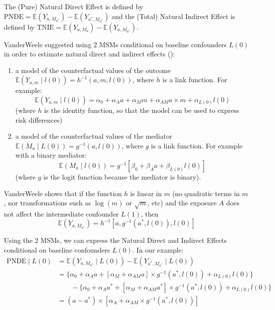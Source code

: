 \documentclass[
]{book}
\begin{document}
The (Pure) Natural Direct Effect is defined by \(\text{PNDE} = \mathbb{E}(Y_{a,M_{a^*}}) - \mathbb{E}(Y_{a^*,M_{a^*}})\) and the (Total) Natural Indirect Effect is defined by \(\text{TNIE} = \mathbb{E}(Y_{a,M_a}) - \mathbb{E}(Y_{a,M_{a^*}})\).

VanderWeele suggested using 2 MSMs conditional on baseline confounders \(L(0)\) in order to estimate natural direct and indirect effects ():

\begin{enumerate}
\def\labelenumi{\arabic{enumi})}
\item
  a model of the counterfactual values of the outcome \(\mathbb{E}(Y_{a,m} \mid l(0))=h^{-1}(a,m,l(0))\), where \(h\) is a link function. For example:
  \begin{equation}
      \mathbb{E}(Y_{a,m} \mid l(0)) = \alpha_0 + \alpha_A a + \alpha_M m + \alpha_{AM} a \times m + \alpha_{L(0)} l(0) \label{eq:MSM-Indirect-model1}
    \end{equation}
  (where \(h\) is the identity function, so that the model can be used to express risk differences)
\item
  a model of the counterfactual values of the mediator \(\mathbb{E}(M_{a} \mid L(0))=g^{-1}(a,l(0))\), where \(g\) is a link function. For example with a binary mediator:
  \begin{equation}
      \mathbb{E}(M_a \mid l(0)) = g^{-1}\left[\beta_0 + \beta_A a + \beta_{L(0)} l(0) \right]
      \label{eq:MSM-Indirect-model2}
    \end{equation}
  (where \(g\) is the logit function because the mediator is binary).
\end{enumerate}

VanderWeele shows that if the function \(h\) is linear in \(m\) (no quadratic terms in \(m\), nor transformations such as \(\log(m)\) or \(\sqrt{m}\), etc) and the exposure \(A\) does not affect the intermediate confounder \(L(1)\), then
\begin{equation*}
  \mathbb{E}(Y_{a,M_{a^*}}) = h^{-1}\left[a,g^{-1}\left(a^*,l(0)\right),l(0)\right]
\end{equation*}

Using the 2 MSMs, we can express the Natural Direct and Indirect Effects conditional on baseline confounders \(L(0)\). In our example:
\begin{align*}
  \text{PNDE} \mid L(0) &= \mathbb{E}(Y_{a,M_{a^*}} \mid L(0)) - \mathbb{E}(Y_{a^*,M_{a^*}} \mid L(0)) \\
  &= \{\alpha_0 + \alpha_A a + [\alpha_M + \alpha_{AM}a] \times g^{-1}(a^*,l(0)) + \alpha_{L(0)} l(0) \} \\
  & \quad \quad - \{ \alpha_0 + \alpha_A a^*+ [\alpha_M + \alpha_{AM}a^*] \times g^{-1}(a^*,l(0)) + \alpha_{L(0)} l(0) \} \\
  &= (a - a^*) \times [\alpha_A + \alpha_{AM} \times g^{-1}(a^*,l(0))]
\end{align*}
\end{document}
